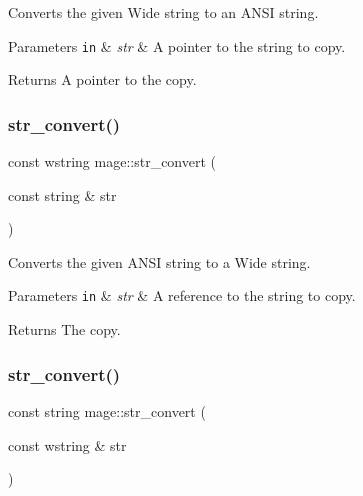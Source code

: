 Converts the given Wide string to an A\+N\+SI string.


\begin{DoxyParams}[1]{Parameters}
\mbox{\tt in}  & {\em str} & A pointer to the string to copy. \\
\hline
\end{DoxyParams}
\begin{DoxyReturn}{Returns}
A pointer to the copy. 
\end{DoxyReturn}
\hypertarget{namespacemage_a9a7ff7b35c293ad8f09d5603f78e4c52}{}\label{namespacemage_a9a7ff7b35c293ad8f09d5603f78e4c52} 
\subsubsection{\texorpdfstring{str\+\_\+convert()}{str\_convert()}\hspace{0.1cm}{\footnotesize\ttfamily [3/4]}}
{\footnotesize\ttfamily const wstring mage\+::str\+\_\+convert (\begin{DoxyParamCaption}\item[{const string \&}]{str }\end{DoxyParamCaption})}

Converts the given A\+N\+SI string to a Wide string.


\begin{DoxyParams}[1]{Parameters}
\mbox{\tt in}  & {\em str} & A reference to the string to copy. \\
\hline
\end{DoxyParams}
\begin{DoxyReturn}{Returns}
The copy. 
\end{DoxyReturn}
\hypertarget{namespacemage_a5425aab167b483cdf05a6aaf0d074ed1}{}\label{namespacemage_a5425aab167b483cdf05a6aaf0d074ed1} 
\subsubsection{\texorpdfstring{str\+\_\+convert()}{str\_convert()}\hspace{0.1cm}{\footnotesize\ttfamily [4/4]}}
{\footnotesize\ttfamily const string mage\+::str\+\_\+convert (\begin{DoxyParamCaption}\item[{const wstring \&}]{str }\end{DoxyParamCaption})}


